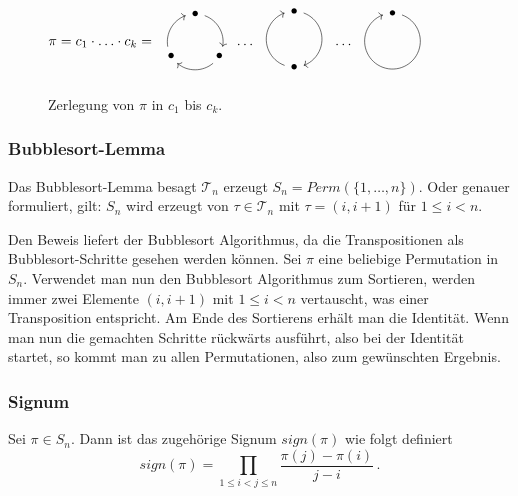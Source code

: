 \documentclass[12pt, german]{article}
\begin{document}
	\begin{figure}[H]
		\centering
		$ \pi = c_1\cdot \ldots\cdot c_k = \begin{array}{ccc}
			\begin{tikzpicture}[->,scale=.7] 
				\foreach \a/\t in {90/.,-30/.,210/.}{
					\node (\t) at (\a:1cm) {$\bullet$};
					\draw (\a-20:1cm)  arc (\a-20:\a-100:1cm);
				} 
			\end{tikzpicture}
		\end{array} \ldots
		\begin{array}{ccc}
			\begin{tikzpicture}[->,scale=.7] 
				\foreach \a/\t in {90/.,-90/.}{
					\node (\t) at (\a:1cm) {$\bullet$};
					\draw (\a-20:1cm)  arc (\a-20:\a-160:1cm);
				} 
			\end{tikzpicture}
		\end{array}
		\ldots
		\begin{array}{ccc}
			\begin{tikzpicture}[->,scale=.7] 
				\foreach \a/\t in {90/.}{
					\node (\t) at (\a:1cm) {$\bullet$};
					\draw (\a-20:1cm)  arc (\a-20:\a-340:1cm);
				} 
			\end{tikzpicture}
		\end{array}$
		\caption{Zerlegung von $\pi$ in $c_1$ bis $c_k$.}
		\label{fig:zykel}
	\end{figure}
	
	\subsubsection{Bubblesort-Lemma}
	Das Bubblesort-Lemma besagt $\mathcal T_n$ erzeugt $S_n = Perm(\{1, \ldots, n\})$. Oder genauer formuliert, gilt: $S_n$ wird erzeugt von $\tau \in \mathcal T_n$ mit $\tau= (i, i+1)$ für $1 \leq i < n$.
	\newline
	
	Den Beweis liefert der Bubblesort Algorithmus, da die Transpositionen als Bubblesort-Schritte gesehen werden können. 
	\newline
	Sei $\pi$ eine beliebige Permutation in $S_n$. Verwendet man nun den Bubblesort Algorithmus zum Sortieren, werden immer zwei Elemente $(i, i+1)$ mit $1 \leq i <n $ vertauscht, was einer Transposition entspricht. Am Ende des Sortierens erhält man die Identität. Wenn man nun die gemachten Schritte rückwärts ausführt, also bei der Identität startet, so kommt man zu allen Permutationen, also zum gewünschten Ergebnis.
	
	\subsubsection{Signum}
	Sei $\pi \in S_n$. Dann ist das zugehörige Signum $sign(\pi)$ wie folgt definiert $$sign(\pi) = \prod_{1 \leq i < j \leq n} \frac{\pi(j) - \pi(i)}{j -i}\, .$$
	
\end{document}
